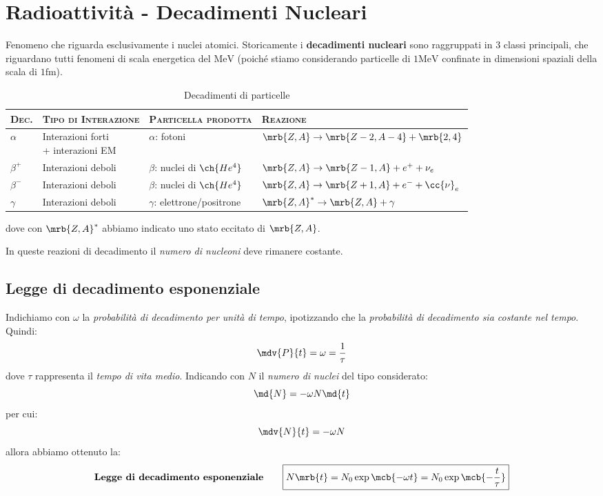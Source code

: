\section{Radioattività - Decadimenti Nucleari}
Fenomeno che riguarda esclusivamente i nuclei atomici.
Storicamente i \textbf{decadimenti nucleari} sono raggruppati in 3 classi
principali, che riguardano tutti fenomeni di scala energetica del $\si{\MeV}$
(poiché stiamo considerando particelle di $1\si{\MeV}$ confinate in dimensioni
spaziali della scala di $1\si{\femto\m}$).
\begin{table}[h!]
  \centering
  \caption{Decadimenti di particelle}
  \begin{tabular}{llll}
    \toprule
    \textsc{Dec.} & \textsc{Tipo di Interazione} & \textsc{Particella
    prodotta} & \textsc{Reazione}
    \\
    \midrule
    $\alpha$ &
    \makecell[l]{Interazioni forti\\+ interazioni EM} &
    $\alpha$: fotoni &
    $\mrb{Z, A} \rightarrow \mrb{Z-2, A-4} + \mrb{2,4}$
    \\
    $\beta^+$ &
    Interazioni deboli &
    $\beta$: nuclei di $\ch{He^4}$ &
    $\mrb{Z, A} \rightarrow \mrb{Z-1, A} + e^+ + \nu_e$
    \\
    $\beta^-$ &
    Interazioni deboli &
    $\beta$: nuclei di $\ch{He^4}$ &
    $\mrb{Z, A} \rightarrow \mrb{Z+1, A} + e^- + \cc{\nu}_{e}$
    \\
    $\gamma$ &
    Interazioni deboli &
    $\gamma$: elettrone/positrone &
    $\mrb{Z,A}^{\ast} \rightarrow \mrb{Z, A} + \gamma$
    \\
    \bottomrule
  \end{tabular}
\end{table}
dove con $\mrb{Z,A}^{\ast}$ abbiamo indicato uno stato eccitato di $\mrb{Z,A}$.

\begin{note}
  In queste reazioni di decadimento il \textit{numero di nucleoni} deve
  rimanere costante.
\end{note}

\subsection{Legge di decadimento esponenziale}
Indichiamo con $\omega$ la \textit{probabilità di decadimento per unità di
tempo}, ipotizzando che la \textit{probabilità di decadimento sia costante nel
tempo}. Quindi:
\[
  \mdv{P}{t} = \omega = \frac{1}{\tau}
\]
dove $\tau$ rappresenta il \textit{tempo di vita medio}.
Indicando con $N$ il \textit{numero di nuclei} del tipo considerato:
\[
  \md{N} = -\omega N \md{t}
\]
per cui:
\[
  \mdv{N}{t} = - \omega N
\]
allora abbiamo ottenuto la:
\[
  \textbf{Legge di decadimento esponenziale}\qquad
  \boxed{
    N \mrb{t} = N_0 \exp \mcb{- \omega t} = N_0 \exp \mcb{-\frac{t}{\tau}}
  }
\]

